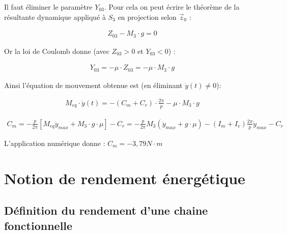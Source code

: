 \documentclass[a4paper,10pt]{article}
\begin{document}
\begin{exemple}

\begin{texteCache}
Il faut éliminer le paramètre $Y_{03}$. Pour cela on peut écrire le théorème de la résultante dynamique appliqué à $S_3$ en projection selon $\overrightarrow{z}_0$ : 

\begin{align*}
Z_{03}-M_3\cdot g=0
\end{align*}

Or la loi de Coulomb donne (avec $Z_{03}>0$ et $Y_{03}<0$) : 

\begin{align*}
Y_{03}=-\mu\cdot Z_{03}=-\mu\cdot M_3\cdot g
\end{align*}

Ainsi l'équation de mouvement obtenue est (en éliminant $\dot{y}(t)\neq 0$): 

\begin{align*}
\boxed{
M_{eq}\cdot \ddot{y}(t)=-\left(C_m+ C_r\right)\cdot \frac{2\pi}{p}- \mu\cdot M_3\cdot g
}
\end{align*}
\end{texteCache}


\begin{texteCache}
\begin{align*}
C_m=-\frac{p}{2\pi}\left[M_{eq}\ddot{y}_{max}+M_3\cdot g\cdot \mu\right]-C_r
=-\frac{p}{2\pi}M_3\left(\ddot{y}_{max}+g\cdot \mu\right)-\left(I_m+I_v\right)\frac{2\pi}{p}\ddot{y}_{max}-C_r
\end{align*}

L'application numérique donne  : $C_m=-3,79N\cdot m$
\end{texteCache}
\end{exemple}



\section{Notion de rendement énergétique}
\subsection{Définition du rendement d'une chaine fonctionnelle}
\end{document}
